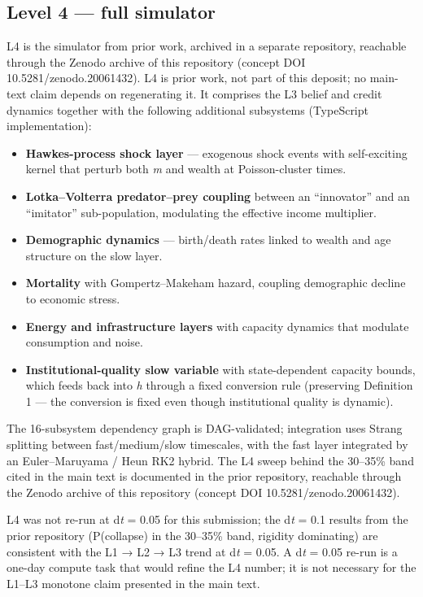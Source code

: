 \documentclass[11pt,letterpaper]{article}
\providecommand{\tightlist}{\setlength{\itemsep}{0pt}\setlength{\parskip}{0pt}}
\begin{document}
\subsection{Level 4 --- full simulator}\label{level-4-full-simulator}

L4 is the simulator from prior work, archived in a separate repository, reachable through the Zenodo archive of this repository (concept DOI 10.5281/zenodo.20061432). L4 is prior work, not part of this deposit; no main-text claim depends on regenerating it. It comprises the L3 belief and credit dynamics together with the following additional subsystems (TypeScript implementation):

\begin{itemize}
\tightlist
\item
  \textbf{Hawkes-process shock layer} \cite{bacry2015} --- exogenous shock events with self-exciting kernel that perturb both \emph{m} and wealth at Poisson-cluster times.
\item
  \textbf{Lotka--Volterra predator--prey coupling} between an ``innovator'' and an ``imitator'' sub-population, modulating the effective income multiplier.
\item
  \textbf{Demographic dynamics} --- birth/death rates linked to wealth and age structure on the slow layer.
\item
  \textbf{Mortality} with Gompertz--Makeham hazard, coupling demographic decline to economic stress.
\item
  \textbf{Energy and infrastructure layers} with capacity dynamics that modulate consumption and noise.
\item
  \textbf{Institutional-quality slow variable} with state-dependent capacity bounds, which feeds back into \emph{h} through a fixed conversion rule (preserving Definition 1 --- the conversion is fixed even though institutional quality is dynamic).
\end{itemize}

The 16-subsystem dependency graph is DAG-validated; integration uses Strang splitting between fast/medium/slow timescales, with the fast layer integrated by an Euler--Maruyama / Heun RK2 hybrid. The L4 sweep behind the 30--35\% band cited in the main text is documented in the prior repository, reachable through the Zenodo archive of this repository (concept DOI 10.5281/zenodo.20061432).

L4 was not re-run at d\emph{t} = 0.05 for this submission; the d\emph{t} = 0.1 results from the prior repository (P(collapse) in the 30--35\% band, rigidity dominating) are consistent with the L1 → L2 → L3 trend at d\emph{t} = 0.05. A d\emph{t} = 0.05 re-run is a one-day compute task that would refine the L4 number; it is not necessary for the L1--L3 monotone claim presented in the main text.
\end{document}

